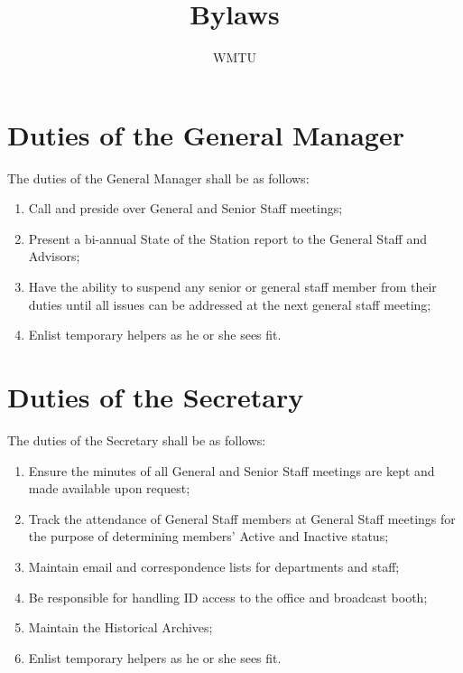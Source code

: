 \documentclass[12pt]{constitution}
\begin{document}
\title{Bylaws}
\author{WMTU}
\date{}
\maketitle
\setcounter{tocdepth}{1}
\tableofcontents
\newpage




\section{Duties of the General Manager}
The duties of the General Manager shall be as follows:
\begin{enumerate}
\item Call and preside over General and Senior Staff meetings;
\item Present a bi-­annual State of the Station report to the General Staff and Advisors;
\item Have the ability to suspend any senior or general staff member from their duties until all issues can be addressed at the next general staff meeting;
\item Enlist temporary helpers as he or she sees fit.
\end{enumerate}


\section{​Duties of the Secretary}
The duties of the Secretary shall be as follows:
\begin{enumerate}
\item Ensure the minutes of all General and Senior Staff meetings are kept and made available upon request;
\item Track the attendance of General Staff members at General Staff meetings for the purpose of determining members' Active and Inactive status;
\item Maintain email and correspondence lists for departments and staff;
\item Be responsible for handling ID access to the office and broadcast booth;
\item Maintain the Historical Archives;
\item Enlist temporary helpers as he or she sees fit.
\end{enumerate}
\end{document}
